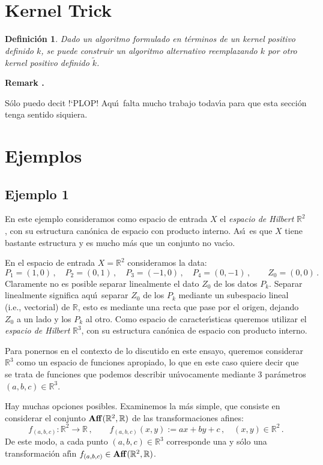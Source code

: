 \documentclass[12pt,reqno]{amsart}
\newtheorem*{mydef}{Definici\'on}
\newenvironment{mycolor}{\color{red}}{}
\newcounter{myremarkcount}
\newenvironment{myremark}
{%
\medskip
\begin{flushright}
\begin{lrbox}{\myremarkbox}%
\begin{minipage}[t]{0.9\linewidth}
\stepcounter{myremarkcount}
\footnotesize
\begin{mycolor}
{\bf Remark \arabic{myremarkcount}.}
\begin{it}
}
{%
\end{it}
\end{mycolor}
\end{minipage}
\end{lrbox}
\fbox{\usebox{\myremarkbox}}
\end{flushright}

\bigskip}
\begin{document}
\section{Kernel Trick}

\begin{mydef}
Dado un algoritmo formulado en t\'erminos de un kernel positivo
definido $k$, se puede construir un algoritmo alternativo
reemplazando $k$ por otro kernel positivo definido $\tilde{k}$.
\end{mydef}

\begin{myremark}
S\'olo puedo decit !`PLOP!
Aqu\'\i\ falta mucho trabajo todav\'\i a para que esta secci\'on
tenga sentido siquiera.
\end{myremark}


\newpage
\section{Ejemplos}


\subsection{Ejemplo 1}
En este ejemplo consideramos como espacio de entrada $X$ el
{\em espacio de Hilbert\/} $\mathbb{R}^2$, con su estructura
can\'onica de espacio con producto interno.
As\'\i\ es que $X$ tiene bastante estructura y es mucho m\'as que
un conjunto no vac\'\i o.

\smallskip\noindent
En el espacio de entrada $X=\mathbb{R}^2$ consideramos la data:
$$
P_1=(1,0)\,,\quad
P_2=(0,1)\,,\quad
P_3=(-1,0)\,,\quad
P_4=(0,-1)\,,\qquad
Z_0=(0,0)\,.
$$
Claramente no es posible separar linealmente el dato $Z_0$
de los datos $P_k$.
Separar linealmente significa aqu\'\i\ separar $Z_0$ de los $P_k$
mediante un subespacio lineal (i.e., vectorial) de $\mathbb{R}$,
esto es mediante una recta que pase por el origen, dejando $Z_0$
a un lado y los $P_k$ al otro.
\smallskip\noindent
Como espacio de caracter\'\i sticas queremos utilizar el
{\em espacio de Hilbert\/} $\mathbb{R}^3$, con su estructura
can\'onica de espacio con producto interno.

\smallskip\noindent
Para ponernos en el contexto de lo discutido en este ensayo,
queremos considerar $\mathbb{R}^3$ como un espacio de funciones
apropiado, lo que en este caso quiere decir que se trata de
funciones que podemos describir un\'\i vocamente mediante 3
par\'ametros $(a,b,c)\in\mathbb{R}^3$.

\smallskip\noindent
Hay muchas opciones posibles.
Examinemos la m\'as simple, que consiste en considerar el conjunto
${\rm\bf Aff}(\mathbb{R}^2,\mathbb{R})$ de las transformaciones afines:
$$
f_{(a,b,c)}:\mathbb{R}^2\to\mathbb{R}\,,\qquad
f_{(a,b,c)}(x,y):= ax+by+c\,,\quad (x,y)\in\mathbb{R}^2\,.
$$
De este modo, a cada punto $(a,b,c)\in\mathbb{R}^3$ corresponde una
y s\'olo una transformaci\'on af\'\i n
$f_{(a,b,c)}\in{\rm\bf Aff}(\mathbb{R}^2,\mathbb{R})$.
\end{document}
